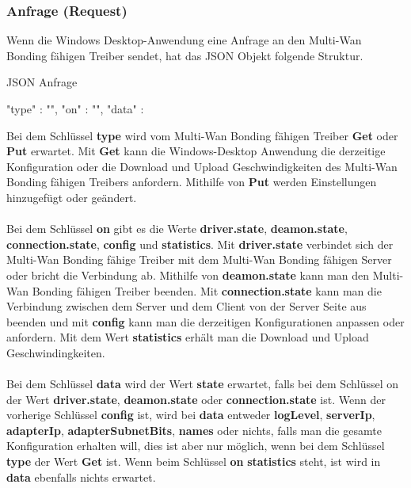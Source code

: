 \subsubsection{Anfrage (Request)}
Wenn die Windows Desktop-Anwendung eine Anfrage an den Multi-Wan Bonding fähigen Treiber sendet, hat das JSON Objekt folgende Struktur.
\begin{program}[H]
\caption{JSON Anfrage}
\begin{GenericCode}
    {
        "type" :  "",
        "on" :  "",
        "data" : {} 
    }
\end{GenericCode}
\end{program}
\noindent
Bei dem Schlüssel \textbf{type} wird vom Multi-Wan Bonding fähigen Treiber \textbf{Get} oder \textbf{Put} erwartet. Mit \textbf{Get} kann die Windows-Desktop Anwendung die derzeitige Konfiguration oder die Download und Upload Geschwindigkeiten des Multi-Wan Bonding fähigen Treibers anfordern. Mithilfe von \textbf{Put} werden Einstellungen hinzugefügt oder geändert. 
\\\\
Bei dem Schlüssel \textbf{on} gibt es die Werte \textbf{driver.state}, \textbf{deamon.state}, \textbf{connection.state}, \textbf{config} und \textbf{statistics}. Mit \textbf{driver.state} verbindet sich der Multi-Wan Bonding fähige Treiber mit dem Multi-Wan Bonding fähigen Server oder bricht die Verbindung ab. Mithilfe von \textbf{deamon.state} kann man den Multi-Wan Bonding fähigen Treiber beenden. Mit \textbf{connection.state} kann man die Verbindung zwischen dem Server und dem Client von der Server Seite aus beenden und mit \textbf{config} kann man die derzeitigen Konfigurationen anpassen oder anfordern. Mit dem Wert \textbf{statistics} erhält man die Download und Upload Geschwindingkeiten.
\\\\
Bei dem Schlüssel \textbf{data} wird der Wert \textbf{state} erwartet, falls bei dem Schlüssel on der Wert \textbf{driver.state}, \textbf{deamon.state} oder \textbf{connection.state} ist. Wenn der vorherige Schlüssel \textbf{config} ist, wird bei \textbf{data} entweder \textbf{logLevel}, \textbf{serverIp}, \textbf{adapterIp}, \textbf{adapterSubnetBits}, \textbf{names} oder nichts, falls man die gesamte Konfiguration erhalten will, dies ist aber nur möglich, wenn bei dem Schlüssel \textbf{type} der Wert \textbf{Get} ist. Wenn beim Schlüssel \textbf{on} \textbf{statistics} steht, ist wird in \textbf{data} ebenfalls nichts erwartet. 


